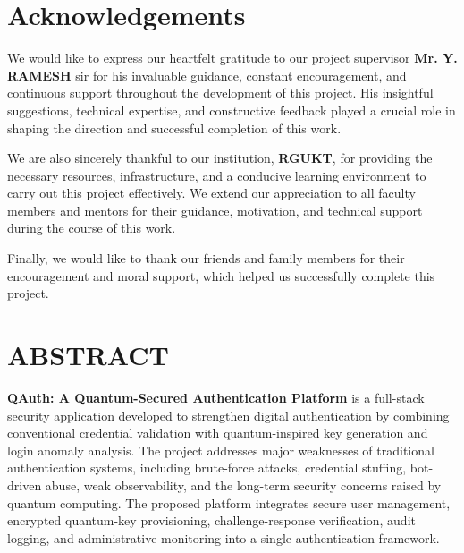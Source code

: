 \documentclass[12pt,a4paper]{report}
\begin{document}
\chapter*{Acknowledgements}

\noindent We would like to express our heartfelt gratitude to our project supervisor
\textbf{Mr. Y. RAMESH} sir for his invaluable guidance, constant encouragement,
and continuous support throughout the development of this project. His insightful
suggestions, technical expertise, and constructive feedback played a crucial role
in shaping the direction and successful completion of this work.
\\
\par

We are also sincerely thankful to our institution, \textbf{RGUKT}, for providing
the necessary resources, infrastructure, and a conducive learning environment to
carry out this project effectively. We extend our appreciation to all faculty
members and mentors for their guidance, motivation, and technical support during
the course of this work.
\\
\par

Finally, we would like to thank our friends and family members for their
encouragement and moral support, which helped us successfully complete
this project.

\chapter*{\centering ABSTRACT}


\vspace{0.2cm}
\noindent \textbf{QAuth: A Quantum-Secured Authentication Platform} is a full-stack security application developed to strengthen digital authentication by combining conventional credential validation with quantum-inspired key generation and login anomaly analysis. The project addresses major weaknesses of traditional authentication systems, including brute-force attacks, credential stuffing, bot-driven abuse, weak observability, and the long-term security concerns raised by quantum computing. The proposed platform integrates secure user management, encrypted quantum-key provisioning, challenge-response verification, audit logging, and administrative monitoring into a single authentication framework.
\end{document}
